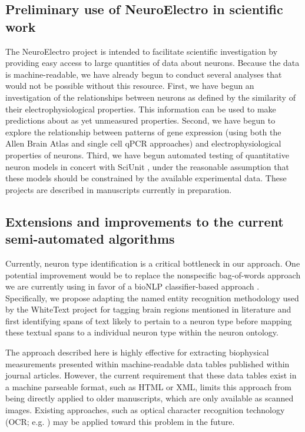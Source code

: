 \documentclass{template/frontiersSCNS} %
\begin{document}
\subsection{Preliminary use of NeuroElectro in scientific work}
The NeuroElectro project is intended to facilitate scientific investigation by providing easy access to large quantities of data about neurons.  
Because the data is machine-readable, we have already begun to conduct several analyses that would not be possible without this resource.  
First, we have begun an investigation of the relationships between neurons as defined by the similarity of their electrophysiological properties.  
This information can be used to make predictions about as yet unmeasured properties.  
Second, we have begun to explore the relationship between patterns of gene expression (using both the Allen Brain Atlas \citep{lein_genome-wide_2007} and single cell qPCR approaches) and electrophysiological properties of neurons.  
Third, we have begun automated testing of quantitative neuron models in concert with SciUnit \citep{omar_sciunit_2014}, under the reasonable assumption that these models should be constrained by the available experimental data.  
These projects are described in manuscripts currently in preparation.  

\subsection{Extensions and improvements to the current semi-automated algorithms}
Currently, neuron type identification is a critical bottleneck in our approach.  
One potential improvement would be to replace the nonspecific bag-of-words approach we are currently using in favor of a bioNLP classifier-based approach \citep{mccallum_mallet:_2002}.  
Specifically, we propose adapting the named entity recognition methodology used by the WhiteText project for tagging brain regions mentioned in literature \citep{french_automated_2009,french_using_2012} and first identifying spans of text likely to pertain to a neuron type before mapping these textual spans to a individual neuron type within the neuron ontology.  

The approach described here is highly effective for extracting biophysical measurements presented within machine-readable data tables published within journal articles.  
However, the current requirement that these data tables exist in a machine parseable format, such as HTML or XML, limits this approach from being directly applied to older manuscripts, which are only available as scanned images.  
Existing approaches, such as optical character recognition technology (OCR; e.g. \citep{ramakrishnan_layout-aware_2012}) may be applied toward this problem in the future. 
\end{document}
